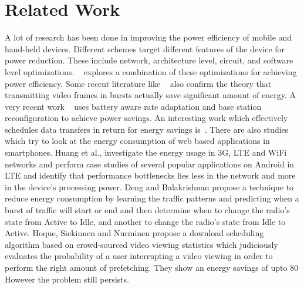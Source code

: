 \section{Related Work}
A lot of research has been done in improving the power efficiency of mobile and hand-held devices. Different schemes target different features of the device for power reduction. These include network, architecture level, circuit, and software level optimizations. ~\cite{mohapatra_mm03} explores a combination of these optimizations for achieving power efficiency. Some recent literature like ~\cite{mobiarch,movid} also confirm the theory that transmitting video frames in bursts actually save significant amount of energy. A very recent work ~\cite{ucsd_wcnc} uses battery aware rate adaptation and base station reconfiguration to achieve power savings. An interesting work which effectively schedules data transfers in return for energy savings is~\cite{balasubramanian_imc09}. There are also studies which try to look at the energy consumption of web based applications in smartphones. Huang et al.,\cite{huang2012close} investigate the energy usage in 3G, LTE and WiFi networks and perform case studies of several popular applications on Android in LTE and identify that performance bottlenecks lies less in the network and more in the device's processing power.
Deng and Balakrishnan\cite{deng2012traffic} propose a technique to reduce energy consumption by learning the traffic patterns and predicting when a burst of traffic will start or end and then determine when to change the radio's state from Active to Idle, and another to change the radio's state from Idle to Active.
Hoque, Siekinnen and Nurminen\cite{hoque2013using} propose a download scheduling algorithm based on crowd-sourced video viewing statistics which judiciously evaluates the probability of a user interrupting a video viewing in order to perform the right amount of prefetching. They show an energy savings of upto 80%
However the problem still persists. 

